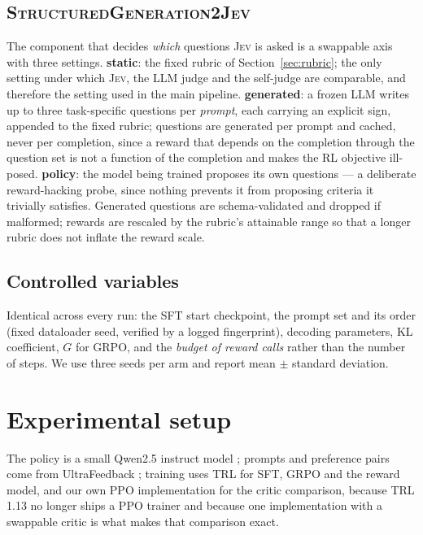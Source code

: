 \documentclass[11pt]{article}
\newcommand{\jev}{\textsc{Jev}}
\begin{document}
\subsection{\textsc{StructuredGeneration2Jev}}
\label{sec:sg2jev}
The component that decides \emph{which} questions \jev{} is asked is a swappable
axis with three settings. \textbf{static}: the fixed rubric of
Section~\ref{sec:rubric}; the only setting under which \jev{}, the LLM judge and
the self-judge are comparable, and therefore the setting used in the main
pipeline. \textbf{generated}: a frozen LLM writes up to three task-specific
questions per \emph{prompt}, each carrying an explicit sign, appended to the
fixed rubric; questions are generated per prompt and cached, never per
completion, since a reward that depends on the completion through the question
set is not a function of the completion and makes the RL objective ill-posed.
\textbf{policy}: the model being trained proposes its own questions --- a
deliberate reward-hacking probe, since nothing prevents it from proposing
criteria it trivially satisfies. Generated questions are schema-validated and
dropped if malformed; rewards are rescaled by the rubric's attainable range so
that a longer rubric does not inflate the reward scale.

\subsection{Controlled variables}
\label{sec:controls}
Identical across every run: the SFT start checkpoint, the prompt set and its
order (fixed dataloader seed, verified by a logged fingerprint), decoding
parameters, KL coefficient, $G$ for GRPO, and the \emph{budget of reward calls}
rather than the number of steps. We use three seeds per arm and report
mean $\pm$ standard deviation.

\section{Experimental setup}

The policy is a small Qwen2.5 instruct model \citep{qwen2025qwen25}; prompts and
preference pairs come from UltraFeedback \citep{cui2023ultrafeedback}; training
uses TRL \citep{vonwerra2020trl} for SFT, GRPO and the reward model, and our own
PPO implementation for the critic comparison, because TRL 1.13 no longer ships a
PPO trainer and because one implementation with a swappable critic is what makes
that comparison exact.


\end{document}
